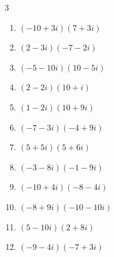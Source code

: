 \begin{multicols}{3}
\begin{enumerate}
        \phantom{$\displaystyle =-3-51i$}

  \item $\displaystyle (-10+3i)(7+3i)$

        \phantom{$\displaystyle =-79-9i$}

  \item $\displaystyle (2-3i)(-7-2i)$

        \phantom{$\displaystyle =-20+17i$}

  \item $\displaystyle (-5-10i)(10-5i)$

        \phantom{$\displaystyle =-100-75i$}

\columnbreak %

\resetques

  \item $\displaystyle (2-2i)(10+i)$

        \phantom{$\displaystyle =22-18i$}

  \item $\displaystyle (1-2i)(10+9i)$

        \phantom{$\displaystyle =28-11i$}

  \item $\displaystyle (-7-3i)(-4+9i)$

        \phantom{$\displaystyle =55-51i$}

  \item $\displaystyle (5+5i)(5+6i)$

        \phantom{$\displaystyle =-5+55i$}

  \item $\displaystyle (-3-8i)(-1-9i)$

        \phantom{$\displaystyle =-69+35i$}

  \item $\displaystyle (-10+4i)(-8-4i)$

        \phantom{$\displaystyle =96+8i$}

  \item $\displaystyle (-8+9i)(-10-10i)$

        \phantom{$\displaystyle =170-10i$}

  \item $\displaystyle (5-10i)(2+8i)$

        \phantom{$\displaystyle =90+20i$}

  \item $\displaystyle (-9-4i)(-7+3i)$

        \phantom{$\displaystyle =75+i$}


\end{enumerate}
\end{multicols}
